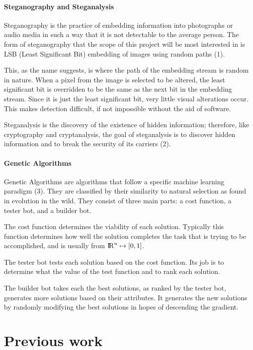 \documentclass[12pt]{article}
\begin{document}
\paragraph{Steganography and Steganalysis}
\par Steganography is the practice of embedding information into photographs or audio media in such a way that it is not detectable to the average person. The form of steganography that the scope of this project will be most interested in is LSB (Least Significant Bit) embedding of images using random paths (1).
\par This, as the name suggests, is where the path of the embedding stream is random in nature. When a pixel from the image is selected to be altered, the least significant bit is overridden to be the same as the next bit in the embedding stream. Since it is just the least significant bit, very little visual alterations occur. This makes detection difficult, if not impossible without the aid of software. 
\par Steganalysis is the discovery of the existence of hidden information; therefore, like cryptography and cryptanalysis, the goal of steganalysis is to discover hidden information and to break the security of its carriers (2).
\paragraph{Genetic Algorithms}
\par Genetic Algorithms are algorithms that follow a specific machine learning paradigm (3). They are classified by their similarity to natural selection as found in evolution in the wild. They consist of three main parts: a cost function, a tester bot, and a builder bot.
\par The cost function determines the viability of each solution. Typically this function determines how well the solution completes the task that is trying to be accomplished, and is usually from ${\rm I\!R}^n \mapsto [0, 1]$. 
\par The tester bot tests each solution based on the cost function. Its job is to determine what the value of the test function and to rank each solution.
\par The builder bot takes each the best solutions, as ranked by the tester bot, generates more solutions based on their attributes. It generates the new solutions by randomly modifying the best solutions in hopes of descending the gradient.

\section{Previous work}
\end{document}
